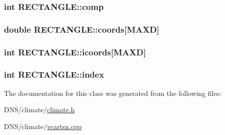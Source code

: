 \subsubsection[{\texorpdfstring{comp}{comp}}]{\setlength{\rightskip}{0pt plus 5cm}int R\+E\+C\+T\+A\+N\+G\+L\+E\+::comp}\hypertarget{class_r_e_c_t_a_n_g_l_e_a45d165ef26bcb8cce21610cc1e1e5215}{}\label{class_r_e_c_t_a_n_g_l_e_a45d165ef26bcb8cce21610cc1e1e5215}
\subsubsection[{\texorpdfstring{coords}{coords}}]{\setlength{\rightskip}{0pt plus 5cm}double R\+E\+C\+T\+A\+N\+G\+L\+E\+::coords\mbox{[}{\bf M\+A\+XD}\mbox{]}}\hypertarget{class_r_e_c_t_a_n_g_l_e_a5632e6ed2e0ef39ce68cc1fe69932abd}{}\label{class_r_e_c_t_a_n_g_l_e_a5632e6ed2e0ef39ce68cc1fe69932abd}
\subsubsection[{\texorpdfstring{icoords}{icoords}}]{\setlength{\rightskip}{0pt plus 5cm}int R\+E\+C\+T\+A\+N\+G\+L\+E\+::icoords\mbox{[}{\bf M\+A\+XD}\mbox{]}}\hypertarget{class_r_e_c_t_a_n_g_l_e_a057e5c1dafe3a9d68154899fb45453b6}{}\label{class_r_e_c_t_a_n_g_l_e_a057e5c1dafe3a9d68154899fb45453b6}
\subsubsection[{\texorpdfstring{index}{index}}]{\setlength{\rightskip}{0pt plus 5cm}int R\+E\+C\+T\+A\+N\+G\+L\+E\+::index}\hypertarget{class_r_e_c_t_a_n_g_l_e_a065964c77ec647cfcbc87a49299cc4d3}{}\label{class_r_e_c_t_a_n_g_l_e_a065964c77ec647cfcbc87a49299cc4d3}


The documentation for this class was generated from the following files\+:\begin{DoxyCompactItemize}
\item 
D\+N\+S/climate/\hyperlink{climate_8h}{climate.\+h}\item 
D\+N\+S/climate/\hyperlink{vcartsn_8cpp}{vcartsn.\+cpp}\end{DoxyCompactItemize}
